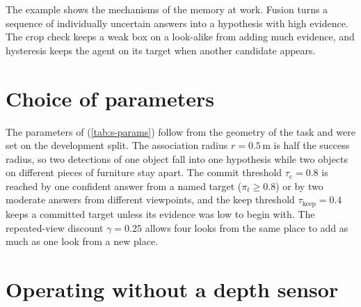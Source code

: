 \begin{table}[htbp]
\centering\small
\caption[Evidence of every hypothesis in one episode]{Evidence of every hypothesis of \ours in the Long-horizon test
episode of \cref{fig:arch} (Qwen3-VL-4B, target: \tTraceTarget). Observation: what the box query returned; $\pi_t$:
full-frame presence; $\pi^z_t$: presence on the crop; $a_t$: weight of the observation (\cref{eq:weight}); $w$:
evidence after the step; Action: the action taken. Bold: the target hypothesis is committed ($w\ge\tau_\mathrm{c}$).}
\label{tab:trace}

\end{table}

The example shows the mechanisms of the memory at work. Fusion turns a sequence of individually uncertain answers
into a hypothesis with high evidence. The crop check keeps a weak box on a look-alike from adding much evidence, and
hysteresis keeps the agent on its target when another candidate appears.

\section{Choice of parameters}
\label{sec:method-params}
The parameters of \ours (\cref{tab:s-params}) follow from the geometry of the task and were set on the development
split. The association radius $r=0.5$\,m is half the success radius, so two detections of one object fall into one
hypothesis while two objects on different pieces of furniture stay apart. The commit threshold $\tau_\mathrm{c}=0.8$ is
reached by one confident answer from a named target ($\pi_t\ge0.8$) or by two moderate answers from different
viewpoints, and the keep threshold $\tau_\mathrm{keep}=0.4$ keeps a committed target unless its evidence was low to begin with.
The repeated-view discount $\gamma=0.25$ allows four looks from the same place to add as much as one look from a new
place.

\section{Operating without a depth sensor}
\label{sec:method-rgb}
